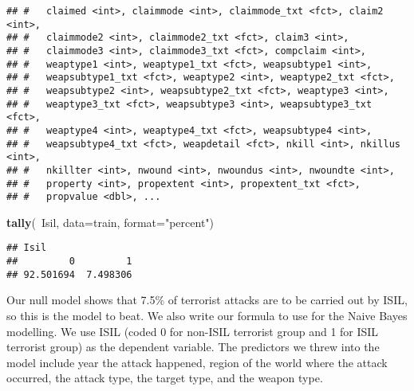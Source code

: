 \documentclass[11pt,letterpaper,]{article}
\newenvironment{Shaded}{\begin{snugshade}}{\end{snugshade}}
\newcommand{\KeywordTok}[1]{\textcolor[rgb]{0.13,0.29,0.53}{\textbf{{#1}}}}
\newcommand{\DataTypeTok}[1]{\textcolor[rgb]{0.13,0.29,0.53}{{#1}}}
\newcommand{\StringTok}[1]{\textcolor[rgb]{0.31,0.60,0.02}{{#1}}}
\newcommand{\NormalTok}[1]{{#1}}
\theoremstyle{definition}
\theoremstyle{definition}
\theoremstyle{definition}
\theoremstyle{remark}
\begin{document}
\begin{verbatim}
## #   claimed <int>, claimmode <int>, claimmode_txt <fct>, claim2 <int>,
## #   claimmode2 <int>, claimmode2_txt <fct>, claim3 <int>,
## #   claimmode3 <int>, claimmode3_txt <fct>, compclaim <int>,
## #   weaptype1 <int>, weaptype1_txt <fct>, weapsubtype1 <int>,
## #   weapsubtype1_txt <fct>, weaptype2 <int>, weaptype2_txt <fct>,
## #   weapsubtype2 <int>, weapsubtype2_txt <fct>, weaptype3 <int>,
## #   weaptype3_txt <fct>, weapsubtype3 <int>, weapsubtype3_txt <fct>,
## #   weaptype4 <int>, weaptype4_txt <fct>, weapsubtype4 <int>,
## #   weapsubtype4_txt <fct>, weapdetail <fct>, nkill <int>, nkillus <int>,
## #   nkillter <int>, nwound <int>, nwoundus <int>, nwoundte <int>,
## #   property <int>, propextent <int>, propextent_txt <fct>,
## #   propvalue <dbl>, ...
\end{verbatim}

\begin{Shaded}
\begin{Highlighting}[]
\KeywordTok{tally}\NormalTok{(~Isil, }\DataTypeTok{data=}\NormalTok{train, }\DataTypeTok{format=}\StringTok{"percent"}\NormalTok{)}
\end{Highlighting}
\end{Shaded}

\begin{verbatim}
## Isil
##         0         1 
## 92.501694  7.498306
\end{verbatim}

\begin{Shaded}
\end{Shaded}

Our null model shows that 7.5\% of terrorist attacks are to be carried
out by ISIL, so this is the model to beat. We also write our formula to
use for the Naive Bayes modelling. We use ISIL (coded 0 for non-ISIL
terrorist group and 1 for ISIL terrorist group) as the dependent
variable. The predictors we threw into the model include year the attack
happened, region of the world where the attack occurred, the attack
type, the target type, and the weapon type.
\end{document}
